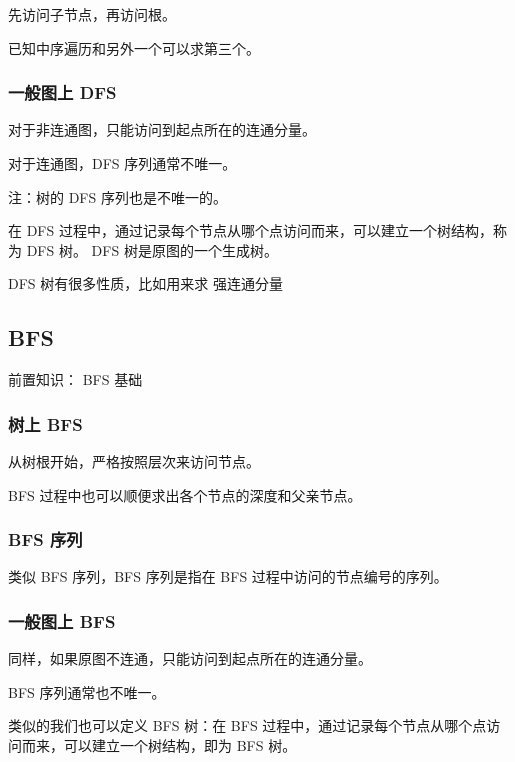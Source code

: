 先访问子节点，再访问根。

已知中序遍历和另外一个可以求第三个。

\subsubsection{一般图上 DFS}

对于非连通图，只能访问到起点所在的连通分量。

对于连通图，DFS 序列通常不唯一。

注：树的 DFS 序列也是不唯一的。

在 DFS 过程中，通过记录每个节点从哪个点访问而来，可以建立一个树结构，称为 DFS 树。 DFS 树是原图的一个生成树。

DFS 树有很多性质，比如用来求  强连通分量 

\subsection{BFS}

前置知识： BFS 基础 

\subsubsection{树上 BFS}

从树根开始，严格按照层次来访问节点。

BFS 过程中也可以顺便求出各个节点的深度和父亲节点。

\subsubsection{BFS 序列}

类似 BFS 序列，BFS 序列是指在 BFS 过程中访问的节点编号的序列。

\subsubsection{一般图上 BFS}

同样，如果原图不连通，只能访问到起点所在的连通分量。

BFS 序列通常也不唯一。

类似的我们也可以定义 BFS 树：在 BFS 过程中，通过记录每个节点从哪个点访问而来，可以建立一个树结构，即为 BFS 树。
